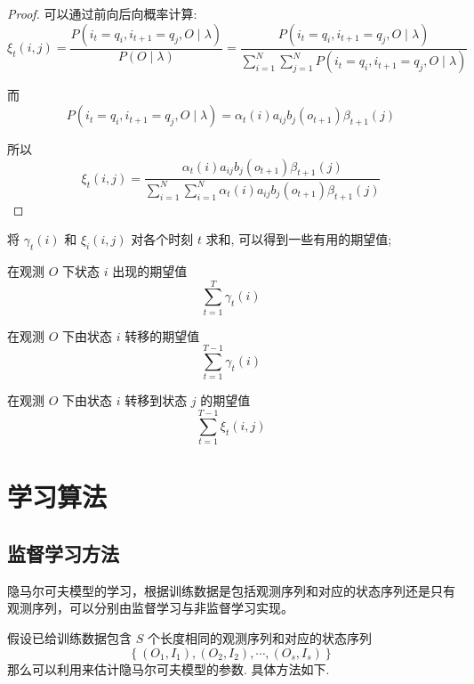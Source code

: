 \begin{proof}
    可以通过前向后向概率计算:
$$
\xi_{t}(i, j)=\frac{P\left(i_{t}=q_{i}, i_{t+1}=q_{j}, O \mid \lambda\right)}{P(O \mid \lambda)}=\frac{P\left(i_{t}=q_{i}, i_{t+1}=q_{j}, O \mid \lambda\right)}{\sum_{i=1}^{N} \sum_{j=1}^{N} P\left(i_{t}=q_{i}, i_{t+1}=q_{j}, O \mid \lambda\right)}
$$

而
$$
P\left(i_{t}=q_{i}, i_{t+1}=q_{j}, O \mid \lambda\right)=\alpha_{t}(i) a_{i j} b_{j}\left(o_{t+1}\right) \beta_{t+1}(j)
$$


所以
$$ \xi_{t}(i, j)=\frac{\alpha_{t}(i) a_{i j} b_{j}\left(o_{t+1}\right) \beta_{t+1}(j)}{\sum_{i=1}^{N} \sum_{i=1}^{N} \alpha_{t}(i) a_{i j} b_{j}\left(o_{t+1}\right) \beta_{t+1}(j)} $$
\end{proof}

将 $ \gamma_{t}(i) $ 和 $ \xi_{i}(i, j) $ 对各个时刻 $ t $ 求和, 可以得到一些有用的期望值;

\begin{theorem}
   在观测 $ O $ 下状态 $ i $ 出现的期望值
$$
\sum_{t=1}^{T} \gamma_{t}(i)
$$ 
\end{theorem}

\begin{theorem}
    在观测 $ O $ 下由状态 $ i $ 转移的期望值
$$
\sum_{t=1}^{T-1} \gamma_{t}(i)
$$
\end{theorem}

\begin{theorem}
    在观测 $ O $ 下由状态 $ i $ 转移到状态 $ j $ 的期望值
$$ \sum_{t=1}^{T-1} \xi_{t}(i, j) $$
\end{theorem}

\section{学习算法}

\subsection{监督学习方法}

隐马尔可夫模型的学习，根据训练数据是包括观测序列和对应的状态序列还是只有观测序列，可以分别由监督学习与非监督学习实现。

假设已给训练数据包含 $ S $ 个长度相同的观测序列和对应的状态序列 $$ \left\{\left(O_{1}, I_{1}\right),\left(O_{2}, I_{2}\right), \cdots,\left(O_{s}, I_{s}\right)\right\} $$
那么可以利用来估计隐马尔可夫模型的参数. 具体方法如下.

